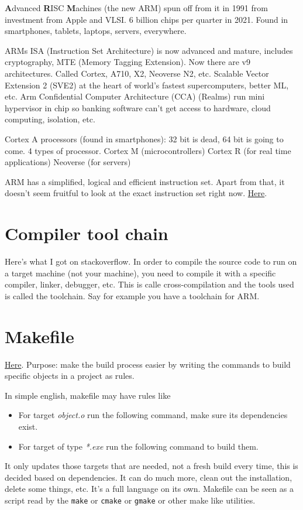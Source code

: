 \documentclass[11pt]{article}
\begin{document}
\textbf{A}dvanced \textbf{R}ISC \textbf{M}achines (the new ARM) spun
off from it in 1991 from investment from Apple and VLSI. 6 billion
chips per quarter in 2021. Found in smartphones, tablets, laptops,
servers, everywhere.

ARMs ISA (Instruction Set Architecture) is now advanced and mature,
includes cryptography, MTE (Memory Tagging Extension). Now there are
v9 architectures. Called Cortex, A710, X2, Neoverse N2, etc.
Scalable Vector Extension 2 (SVE2) at the heart of world's fastest
supercomputers, better ML, etc.
Arm Confidential Computer Architecture (CCA) (Realms)
run mini hypervisor in chip so banking software can't get access to
hardware, cloud computing, isolation, etc.

Cortex A processors (found in smartphones): 32 bit is dead, 64 bit is
going to come.
4 types of processor.
Cortex M (microcontrollers)
Cortex R (for real time applications)
Neoverse (for servers)

ARM has a simplified, logical and efficient instruction set. Apart
from that, it doesn't seem fruitful to look at the exact instruction
set right now. \href{https://developer.arm.com/documentation/den0013/d/Introduction-to-Assembly-Language/Comparison-with-other-assembly-languages}{Here}.

\section{Compiler tool chain}
\label{sec:org791d967}

Here's what I got on stackoverflow. In order to compile the source
code to run on a target machine (not your machine), you need to
compile it with a specific compiler, linker, debugger, etc. This is
calle cross-compilation and the tools used is called the
toolchain. Say for example you have a toolchain for ARM.

\section{Makefile}
\label{sec:org03bbcee}

\href{https://makefiletutorial.com/}{Here}. Purpose: make the build process easier by writing the commands
to build specific objects in a project as rules.

In simple english, makefile may have rules like
\begin{itemize}
\item For target \emph{object.o} run the following command, make sure its
dependencies exist.
\item For target of type \emph{*.exe} run the following command to build them.
\end{itemize}

It only updates those targets that are needed, not a fresh build every
time, this is decided based on dependencies. It can do much more,
clean out the installation, delete some things, etc. It's a full
language on its own. Makefile can be seen as a script read by the
\texttt{make} or \texttt{cmake} or \texttt{gmake} or other make like utilities.
\end{document}
